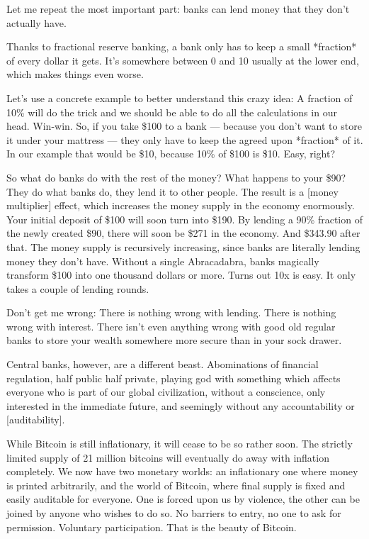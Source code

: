 Let me repeat the most important part: banks can lend money that they
don't actually have.

Thanks to fractional reserve banking, a bank only has to keep a small
*fraction* of every dollar it gets. It's somewhere between 0 and 10%
usually at the lower end, which makes things even worse.

Let's use a concrete example to better understand this crazy idea: A
fraction of 10\% will do the trick and we should be able to do all the
calculations in our head. Win-win. So, if you take \$100 to a
bank --- because you don't want to store it under your mattress --- they
only have to keep the agreed upon *fraction* of it. In our example that
would be \$10, because 10\% of \$100 is \$10. Easy, right?

So what do banks do with the rest of the money? What happens to your
\$90? They do what banks do, they lend it to other people. The result is
a [money multiplier] effect, which increases the money supply in the
economy enormously. Your initial deposit of \$100 will soon turn into
\$190. By lending a 90\% fraction of the newly created \$90, there will
soon be \$271 in the economy. And \$343.90 after that. The money supply
is recursively increasing, since banks are literally lending money they
don't have. Without a single Abracadabra, banks magically transform
\$100 into one thousand dollars or more. Turns out 10x is easy. It only
takes a couple of lending rounds.


Don't get me wrong: There is nothing wrong with lending. There is
nothing wrong with interest. There isn't even anything wrong with good
old regular banks to store your wealth somewhere more secure than in
your sock drawer.

Central banks, however, are a different beast. Abominations of financial
regulation, half public half private, playing god with something which
affects everyone who is part of our global civilization, without a
conscience, only interested in the immediate future, and seemingly
without any accountability or [auditability].

While Bitcoin is still inflationary, it will cease to be so rather soon.
The strictly limited supply of 21 million bitcoins will eventually do
away with inflation completely. We now have two monetary worlds: an
inflationary one where money is printed arbitrarily, and the world of
Bitcoin, where final supply is fixed and easily auditable for everyone.
One is forced upon us by violence, the other can be joined by anyone who
wishes to do so. No barriers to entry, no one to ask for permission.
Voluntary participation. That is the beauty of Bitcoin.

